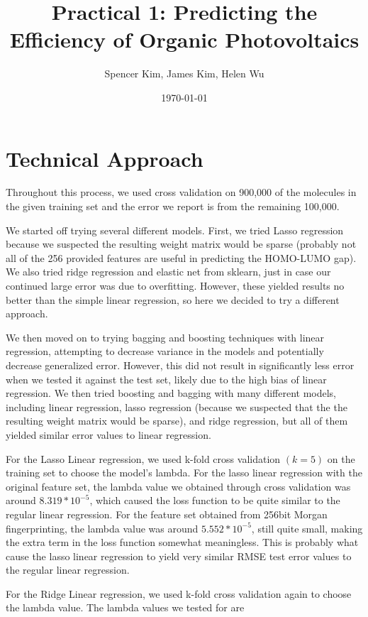 \documentclass[11pt]{article}
\title{Practical 1: Predicting the Efficiency of Organic Photovoltaics}
\author{Spencer Kim, James Kim, Helen Wu}
\date{\today}
\begin{document}
\maketitle
\section{Technical Approach}
Throughout this process, we used cross validation on 900,000 of the molecules in the given training set and the error we report is from the remaining 100,000.

We started off trying several different models. First, we tried Lasso regression because we suspected the resulting weight matrix would be sparse (probably not all of the 256 provided features are useful in predicting the HOMO-LUMO gap). We also tried ridge regression and elastic net from sklearn, just in case our continued large error was due to overfitting. However, these yielded results no better than the simple linear regression, so here we decided to try a different approach.

We then moved on to trying bagging and boosting techniques with linear regression, attempting to decrease variance in the models and potentially decrease generalized error. However, this did not result in significantly less error when we tested it against the test set, likely due to the high bias of linear regression. We then tried boosting and bagging with many different models, including linear regression, lasso regression (because we suspected that the the resulting weight matrix would be sparse), and ridge regression, but all of them yielded similar error values to linear regression.

For the Lasso Linear regression, we used k-fold cross validation $(k = 5)$ on the training set to choose the model's lambda. For the lasso linear regression with the original feature set, the lambda value we obtained through cross validation was around $8.319 * 10^{-5}$, which caused the loss function to be quite similar to the regular linear regression. For the feature set obtained from 256bit Morgan fingerprinting, the lambda value was around $5.552 * 10^{-5}$, still quite small, making the extra term in the loss function somewhat meaningless. This is probably what cause the lasso linear regression to yield very similar RMSE test error values to the regular linear regression.

For the Ridge Linear regression, we used k-fold cross validation again to choose the lambda value. The lambda values we tested for are
\end{document}
